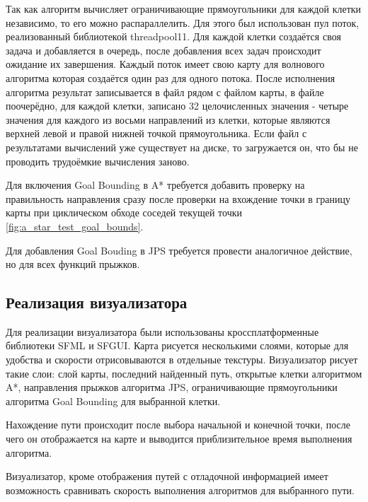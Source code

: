 

Так как алгоритм вычисляет ограничивающие прямоугольники для каждой клетки независимо, то его можно распараллелить. Для этого был использован пул поток, реализованный библиотекой threadpool11. Для каждой клетки создаётся своя задача и добавляется в очередь, после добавления всех задач происходит ожидание их завершения. Каждый поток имеет свою карту для волнового алгоритма которая создаётся один раз для одного потока. После исполнения алгоритма результат записывается в файл рядом с файлом карты, в файле поочерёдно, для каждой клетки, записано 32 целочисленных значения - четыре значения для каждого из восьми направлений из клетки, которые являются верхней левой и правой нижней точкой прямоугольника. Если файл с результатами вычислений уже существует на диске, то загружается он, что бы не проводить трудоёмкие вычисления заново.

Для включения Goal Bounding в A* требуется добавить проверку на правильность направления сразу после проверки на вхождение точки в границу карты при циклическом обходе соседей текущей точки \cref{fig:a_star_test_goal_bounds}. 

Для добавления Goal Bouding в JPS требуется провести аналогичное действие, но для всех функций прыжков.


\subsection{Реализация визуализатора}

Для реализации визуализатора были использованы кроссплатформенные библиотеки SFML и SFGUI. Карта рисуется несколькими слоями, которые для удобства и скорости отрисовываются в отдельные текстуры. Визуализатор рисует такие слои: слой карты, последний найденный путь, открытые клетки алгоритмом A*, направления прыжков алгоритма JPS, ограничивающие прямоугольники алгоритма Goal Bounding для выбранной клетки.

Нахождение пути происходит после выбора начальной и конечной точки, после чего он отображается на карте и выводится приблизительное время выполнения алгоритма. 

Визуализатор, кроме отображения путей с отладочной информацией имеет возможность сравнивать скорость выполнения алгоритмов для выбранного пути.